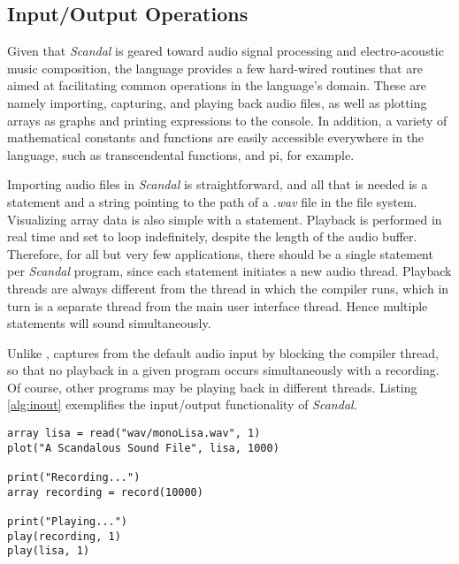 \subsection{Input/Output Operations}

Given that \emph{Scandal} is geared toward audio signal processing and electro-acoustic music composition, the language provides a few hard-wired routines that are aimed at facilitating common operations in the language's domain. These are namely importing, capturing, and playing back audio files, as well as plotting arrays as graphs and printing expressions to the console. In addition, a variety of mathematical constants and functions are easily accessible everywhere in the language, such as transcendental functions, and pi, for example.

Importing audio files in \emph{Scandal} is straightforward, and all that is needed is a  statement and a string pointing to the path of a \emph{.wav} file in the file system. Visualizing array data is also simple with a  statement. Playback is performed in real time and set to loop indefinitely, despite the length of the audio buffer. Therefore, for all but very few applications, there should be a single  statement per \emph{Scandal} program, since each  statement initiates a new audio thread. Playback threads are always different from the thread in which the compiler runs, which in turn is a separate thread from the main user interface thread. Hence multiple  statements will sound simultaneously.

Unlike ,  captures from the default audio input by blocking the compiler thread, so that no playback in a given program occurs simultaneously with a recording. Of course, other programs may be playing back in different threads. Listing \ref{alg:inout} exemplifies the input/output functionality of \emph{Scandal}. %

\begin{lstlisting}[emph={array,read,string,plot,print,record,play,import},emphstyle={\textbf},caption={Inputting and outputting in \emph{Scandal}},label={alg:inout}]
array lisa = read("wav/monoLisa.wav", 1)
plot("A Scandalous Sound File", lisa, 1000)

print("Recording...")
array recording = record(10000)

print("Playing...")
play(recording, 1)
play(lisa, 1)
\end{lstlisting}

